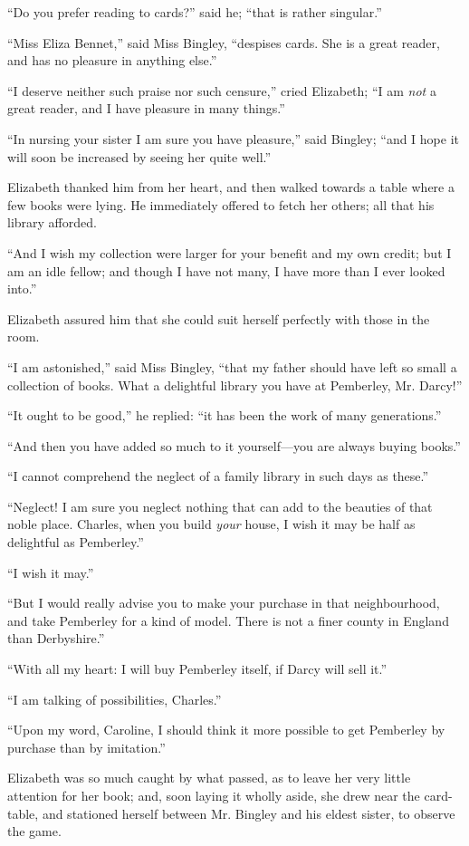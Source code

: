 \documentclass[12pt,openright]{book}
\begin{document}
“Do you prefer reading to cards?” said he; “that is rather singular.”

“Miss Eliza Bennet,” said Miss Bingley, “despises cards. She is a great reader, and has no pleasure in anything else.”

“I deserve neither such praise nor such censure,” cried Elizabeth; “I am \textit{not} a great reader, and I have pleasure in many things.”

“In nursing your sister I am sure you have pleasure,” said Bingley; “and I hope it will soon be increased by seeing her quite well.”

Elizabeth thanked him from her heart, and then walked towards a table where a few books were lying. He immediately offered to fetch her others; all that his library afforded.

“And I wish my collection were larger for your benefit and my own credit; but I am an idle fellow; and though I have not many, I have more than I ever looked into.”

Elizabeth assured him that she could suit herself perfectly with those in the room.

“I am astonished,” said Miss Bingley, “that my father should have left so small a collection of books. What a delightful library you have at Pemberley, Mr. Darcy!”

“It ought to be good,” he replied: “it has been the work of many generations.”

“And then you have added so much to it yourself—you are always buying books.”

“I cannot comprehend the neglect of a family library in such days as these.”

“Neglect! I am sure you neglect nothing that can add to the beauties of that noble place. Charles, when you build \textit{your} house, I wish it may be half as delightful as Pemberley.”

“I wish it may.”

“But I would really advise you to make your purchase in that neighbourhood, and take Pemberley for a kind of model. There is not a finer county in England than Derbyshire.”

“With all my heart: I will buy Pemberley itself, if Darcy will sell it.”

“I am talking of possibilities, Charles.”

“Upon my word, Caroline, I should think it more possible to get Pemberley by purchase than by imitation.”

Elizabeth was so much caught by what passed, as to leave her very little attention for her book; and, soon laying it wholly aside, she drew near the card-table, and stationed herself between Mr. Bingley and his eldest sister, to observe the game.
\end{document}
